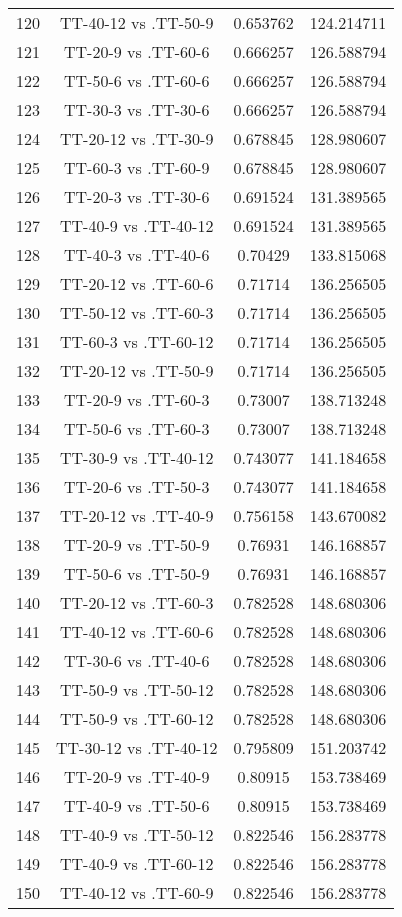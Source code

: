 \documentclass[a4paper,10pt]{article}
\begin{document}
\begin{landscape}
\begin{table}[!htp]
\begin{tabular}{cccc}
120&TT-40-12 vs .TT-50-9&0.653762&124.214711\\
121&TT-20-9 vs .TT-60-6&0.666257&126.588794\\
122&TT-50-6 vs .TT-60-6&0.666257&126.588794\\
123&TT-30-3 vs .TT-30-6&0.666257&126.588794\\
124&TT-20-12 vs .TT-30-9&0.678845&128.980607\\
125&TT-60-3 vs .TT-60-9&0.678845&128.980607\\
126&TT-20-3 vs .TT-30-6&0.691524&131.389565\\
127&TT-40-9 vs .TT-40-12&0.691524&131.389565\\
128&TT-40-3 vs .TT-40-6&0.70429&133.815068\\
129&TT-20-12 vs .TT-60-6&0.71714&136.256505\\
130&TT-50-12 vs .TT-60-3&0.71714&136.256505\\
131&TT-60-3 vs .TT-60-12&0.71714&136.256505\\
132&TT-20-12 vs .TT-50-9&0.71714&136.256505\\
133&TT-20-9 vs .TT-60-3&0.73007&138.713248\\
134&TT-50-6 vs .TT-60-3&0.73007&138.713248\\
135&TT-30-9 vs .TT-40-12&0.743077&141.184658\\
136&TT-20-6 vs .TT-50-3&0.743077&141.184658\\
137&TT-20-12 vs .TT-40-9&0.756158&143.670082\\
138&TT-20-9 vs .TT-50-9&0.76931&146.168857\\
139&TT-50-6 vs .TT-50-9&0.76931&146.168857\\
140&TT-20-12 vs .TT-60-3&0.782528&148.680306\\
141&TT-40-12 vs .TT-60-6&0.782528&148.680306\\
142&TT-30-6 vs .TT-40-6&0.782528&148.680306\\
143&TT-50-9 vs .TT-50-12&0.782528&148.680306\\
144&TT-50-9 vs .TT-60-12&0.782528&148.680306\\
145&TT-30-12 vs .TT-40-12&0.795809&151.203742\\
146&TT-20-9 vs .TT-40-9&0.80915&153.738469\\
147&TT-40-9 vs .TT-50-6&0.80915&153.738469\\
148&TT-40-9 vs .TT-50-12&0.822546&156.283778\\
149&TT-40-9 vs .TT-60-12&0.822546&156.283778\\
150&TT-40-12 vs .TT-60-9&0.822546&156.283778\\

\end{tabular}
\end{table}
\end{landscape}
\end{document}
